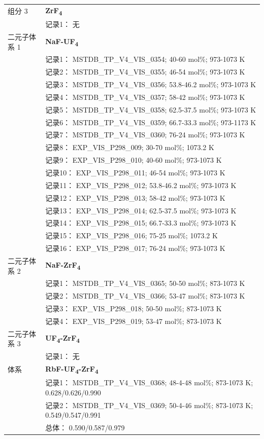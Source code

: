 \documentclass[12pt]{article}
\begin{document}
{\begin{longtable}[]{@{}
  >{\raggedright\arraybackslash}p{}
  >{\raggedright\arraybackslash}p{}@{}}
组分 3 & \textbf{ZrF\textsubscript{4}} \\
 & 记录1： 无 \\
二元子体系 1  & \textbf{NaF-UF\textsubscript{4}} \\
 & 记录1： MSTDB\_TP\_V4\_VIS\_0354; 40-60 mol\%; 973-1073 K \\
 & 记录2： MSTDB\_TP\_V4\_VIS\_0355; 46-54 mol\%; 973-1073 K \\
 & 记录3： MSTDB\_TP\_V4\_VIS\_0356; 53.8-46.2 mol\%; 973-1073 K \\
 & 记录4： MSTDB\_TP\_V4\_VIS\_0357; 58-42 mol\%; 973-1073 K \\
 & 记录5： MSTDB\_TP\_V4\_VIS\_0358; 62.5-37.5 mol\%; 973-1073 K \\
 & 记录6： MSTDB\_TP\_V4\_VIS\_0359; 66.7-33.3 mol\%; 973-1173 K \\
 & 记录7： MSTDB\_TP\_V4\_VIS\_0360; 76-24 mol\%; 973-1073 K \\
 & 记录8： EXP\_VIS\_P298\_009; 30-70 mol\%; 1073.2 K \\
 & 记录9： EXP\_VIS\_P298\_010; 40-60 mol\%; 973-1073 K \\
 & 记录10： EXP\_VIS\_P298\_011; 46-54 mol\%; 973-1073 K \\
 & 记录11： EXP\_VIS\_P298\_012; 53.8-46.2 mol\%; 973-1073 K \\
 & 记录12： EXP\_VIS\_P298\_013; 58-42 mol\%; 973-1073 K \\
 & 记录13： EXP\_VIS\_P298\_014; 62.5-37.5 mol\%; 973-1073 K \\
 & 记录14： EXP\_VIS\_P298\_015; 66.7-33.3 mol\%; 973-1073 K \\
 & 记录15： EXP\_VIS\_P298\_016; 75-25 mol\%; 1073.2 K \\
 & 记录16： EXP\_VIS\_P298\_017; 76-24 mol\%; 973-1073 K  \\

二元子体系 2  & \textbf{NaF-ZrF\textsubscript{4}} \\
 & 记录1： MSTDB\_TP\_V4\_VIS\_0365; 50-50 mol\%; 873-1073 K \\
 & 记录2： MSTDB\_TP\_V4\_VIS\_0366; 53-47 mol\%; 873-1073 K \\
 & 记录3： EXP\_VIS\_P298\_018; 50-50 mol\%; 873-1073 K \\
 & 记录4： EXP\_VIS\_P298\_019; 53-47 mol\%; 873-1073 K  \\

二元子体系 3 & \textbf{UF\textsubscript{4}-ZrF\textsubscript{4}} \\
 & 记录1： 无 \\
\midrule
体系 & \textbf{RbF-UF\textsubscript{4}-ZrF\textsubscript{4}} \\
 & 记录1： MSTDB\_TP\_V4\_VIS\_0368; 48-4-48 mol\%; 873-1073 K; 0.628/0.626/0.990 \\
 & 记录2： MSTDB\_TP\_V4\_VIS\_0369; 50-4-46 mol\%; 873-1073 K; 0.549/0.547/0.991 \\
 & 总体： 0.590/0.587/0.979  \\


\end{longtable}}
\end{document}
